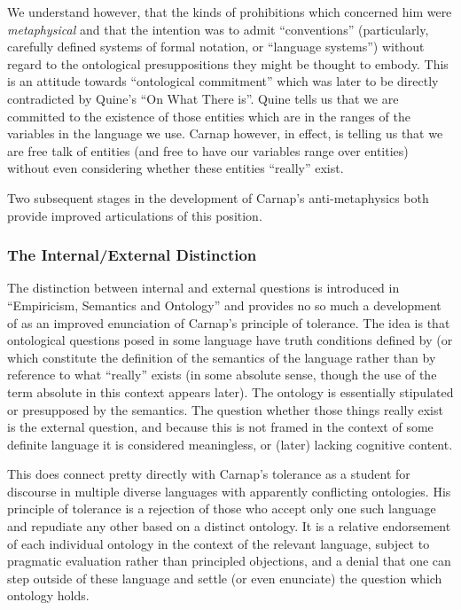 \documentclass[10pt,titlepage]{book}
\begin{document}
We understand however, that the kinds of prohibitions which concerned him were {\it metaphysical} and that the intention was to admit ``conventions'' (particularly, carefully defined systems of formal notation, or ``language systems'') without regard to the ontological presuppositions they might be thought to embody.
This is an attitude towards ``ontological commitment'' which was later to be directly contradicted by Quine's ``On What There is''.
Quine tells us that we are committed to the existence of those entities which are in the ranges of the variables in the language we use.
Carnap however, in effect, is telling us that we are free talk of entities (and free to have our variables range over entities) without even considering whether these entities ``really'' exist.

Two subsequent stages in the development of Carnap's anti-metaphysics both provide improved articulations of this position.

\subsubsection{The Internal/External Distinction}

The distinction between internal and external questions is introduced in ``Empiricism, Semantics and Ontology'' \cite{carnap50} and provides no so much a development of as an improved enunciation of Carnap's principle of tolerance.
The idea is that ontological questions posed in some language have truth conditions defined by (or which constitute the definition of the semantics of the language rather than by reference to what ``really'' exists (in some absolute sense, though the use of the term absolute in this context appears later).
The ontology is essentially stipulated or presupposed by the semantics.
The question whether those things really exist is the external question, and because this is not framed in the context of some definite language it is considered meaningless, or (later) lacking cognitive content.

This does connect pretty directly with Carnap's tolerance as a student for discourse in multiple diverse languages with apparently conflicting ontologies.
His principle of tolerance is a rejection of those who accept only one such language and repudiate any other based on a distinct ontology.
It is a relative endorsement of each individual ontology in the context of the relevant language, subject to pragmatic evaluation rather than principled objections, and a denial that one can step outside of these language and settle (or even enunciate) the question which ontology holds.
\end{document}
